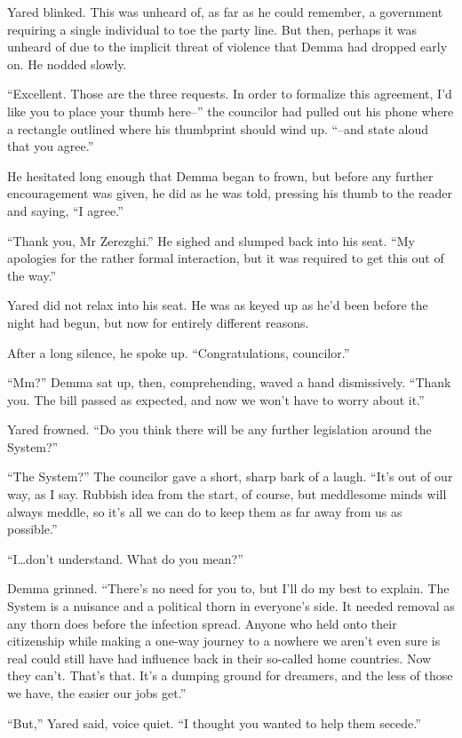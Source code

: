 Yared blinked. This was unheard of, as far as he could remember, a government requiring a single individual to toe the party line. But then, perhaps it was unheard of due to the implicit threat of violence that Demma had dropped early on. He nodded slowly.

``Excellent. Those are the three requests. In order to formalize this agreement, I'd like you to place your thumb here--'' the councilor had pulled out his phone where a rectangle outlined where his thumbprint should wind up. ``--and state aloud that you agree.''

He hesitated long enough that Demma began to frown, but before any further encouragement was given, he did as he was told, pressing his thumb to the reader and saying, ``I agree.''

``Thank you, Mr Zerezghi.'' He sighed and slumped back into his seat. ``My apologies for the rather formal interaction, but it was required to get this out of the way.''

Yared did not relax into his seat. He was as keyed up as he'd been before the night had begun, but now for entirely different reasons.

After a long silence, he spoke up. ``Congratulations, councilor.''

``Mm?'' Demma sat up, then, comprehending, waved a hand dismissively. ``Thank you. The bill passed as expected, and now we won't have to worry about it.''

Yared frowned. ``Do you think there will be any further legislation around the System?''

``The System?'' The councilor gave a short, sharp bark of a laugh. ``It's out of our way, as I say. Rubbish idea from the start, of course, but meddlesome minds will always meddle, so it's all we can do to keep them as far away from us as possible.''

``I\ldots don't understand. What do you mean?''

Demma grinned. ``There's no need for you to, but I'll do my best to explain. The System is a nuisance and a political thorn in everyone's side. It needed removal as any thorn does before the infection spread. Anyone who held onto their citizenship while making a one-way journey to a nowhere we aren't even sure is real could still have had influence back in their so-called home countries. Now they can't. That's that. It's a dumping ground for dreamers, and the less of those we have, the easier our jobs get.''

``But,'' Yared said, voice quiet. ``I thought you wanted to help them secede.''

